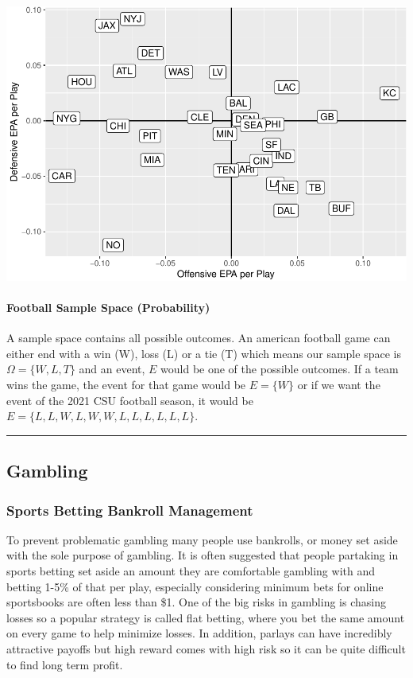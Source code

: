 \documentclass[]{article}
\let\oldparagraph\paragraph
\renewcommand{\paragraph}[1]{\oldparagraph{#1}\mbox{}}
\begin{document}
\includegraphics{22-isaac_files/figure-latex/unnamed-chunk-12-1.pdf}

\hypertarget{football-sample-space-probability}{%
\paragraph{Football Sample Space
(Probability)}\label{football-sample-space-probability}}

A sample space contains all possible outcomes. An american football game
can either end with a win (W), loss (L) or a tie (T) which means our
sample space is \(\Omega = \{W,L,T \}\) and an event, \(E\) would be one
of the possible outcomes. If a team wins the game, the event for that
game would be \(E=\{W \}\) or if we want the event of the 2021 CSU
football season, it would be
\(E=\{ L, L, W, L, W, W, L, L, L, L, L, L \}\).

\begin{center}\rule{0.5\linewidth}{\linethickness}\end{center}

\hypertarget{gambling}{%
\subsection{Gambling}\label{gambling}}

\hypertarget{sports-betting-bankroll-management}{%
\subsubsection{Sports Betting Bankroll
Management}\label{sports-betting-bankroll-management}}

To prevent problematic gambling many people use bankrolls, or money set
aside with the sole purpose of gambling. It is often suggested that
people partaking in sports betting set aside an amount they are
comfortable gambling with and betting 1-5\% of that per play, especially
considering minimum bets for online sportsbooks are often less than \$1.
One of the big risks in gambling is chasing losses so a popular strategy
is called flat betting, where you bet the same amount on every game to
help minimize losses. In addition, parlays can have incredibly
attractive payoffs but high reward comes with high risk so it can be
quite difficult to find long term profit.
\end{document}

